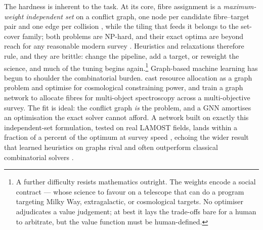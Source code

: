 \documentclass[graybox, envcountchap]{Template/svmult}
\begin{document}
The hardness is inherent to the task. At its core, fibre assignment is a \emph{maximum-weight independent set} on a conflict graph, one node per candidate fibre--target pair and one edge per collision \citep{Sun2026_fiberassign_GNN}, while the tiling that feeds it belongs to the set-cover family; both problems are NP-hard, and their exact optima are beyond reach for any reasonable modern survey \citep{GareyJohnson1979_intractability}. Heuristics and relaxations therefore rule, and they are brittle: change the pipeline, add a target, or reweight the science, and much of the tuning begins again.\footnote{A further difficulty resists mathematics outright. The weights encode a social contract --- whose science to favour on a telescope that can do a program targeting Milky Way, extragalactic, or cosmological targets. No optimiser adjudicates a value judgement; at best it lays the trade-offs bare for a human to arbitrate, but the value function must be human-defined.} Graph-based machine learning has begun to shoulder the combinatorial burden. \citet{Cranmer2021_resourceallocation_unsupervised} cast resource allocation as a graph problem and optimise for cosmological constraining power, and \citet{Wang2022_spectroscopy_resourceallocation} train a graph network to allocate fibres for multi-object spectroscopy across a multi-objective survey. The fit is ideal: the conflict graph \emph{is} the problem, and a GNN amortises an optimisation the exact solver cannot afford. A network built on exactly this independent-set formulation, tested on real LAMOST fields, lands within a fraction of a percent of the optimum at survey speed \citep{Sun2026_fiberassign_GNN}, echoing the wider result that learned heuristics on graphs rival and often outperform classical combinatorial solvers \citep{Dai2017_combinatorial_GNN, Velickovic2021_algorithmic_reasoning}.
\end{document}
